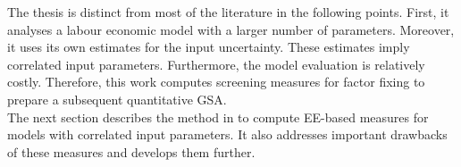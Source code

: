 \newline
The thesis is distinct from most of the literature in the following points. First, it analyses a labour economic model with a larger number of parameters. Moreover, it uses its own estimates for the input uncertainty. These estimates imply correlated input parameters. Furthermore, the model evaluation is relatively costly. Therefore, this work computes screening measures for factor fixing to prepare a subsequent quantitative GSA.
\\
\newline
The next section describes the method in \cite{ge2014efficient} to compute EE-based measures for models with correlated input parameters. It also addresses important drawbacks of these measures and develops them further.